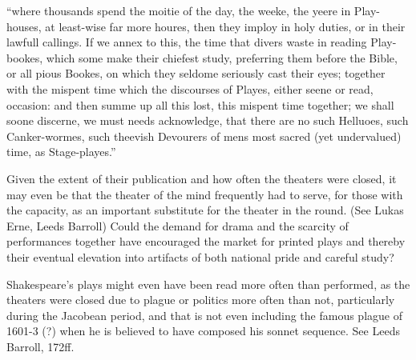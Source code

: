 ``where thousands spend the moitie of the day, the weeke, the yeere in Play-houses, at least-wise far more houres, then they imploy in holy duties, or in their lawfull callings. If we annex to this, the time that divers waste in reading Play-bookes, which some make their chiefest study, preferring them before the Bible, or all pious Bookes, on which they seldome seriously cast their eyes; together with the mispent time which the discourses of Playes, either seene or read, occasion: and then summe up all this lost, this mispent time together; we shall soone discerne, we must needs acknowledge, that there are no such Helluoes, such Canker-wormes, such theevish Devourers of mens most sacred (yet undervalued) time, as Stage-playes.''~\cite[307]{prynne_histrio-mastix_1633}


Given the extent of their publication and how often the theaters were closed, it may even be that the theater of the mind frequently had to serve, for those with the capacity, as an important substitute for the theater in the round. (See Lukas Erne, Leeds Barroll) Could the demand for drama and the scarcity of performances together have encouraged the market for printed plays and thereby their eventual elevation into artifacts of both national pride and careful study?

Shakespeare's plays might even have been read more often than performed, as the theaters were closed due to plague or politics more often than not, particularly during the Jacobean period, and that is not even including the famous plague of 1601-3 (?) when he is believed to have composed his sonnet sequence.\nocite{barroll_politics_1991} See Leeds Barroll, 172ff.


